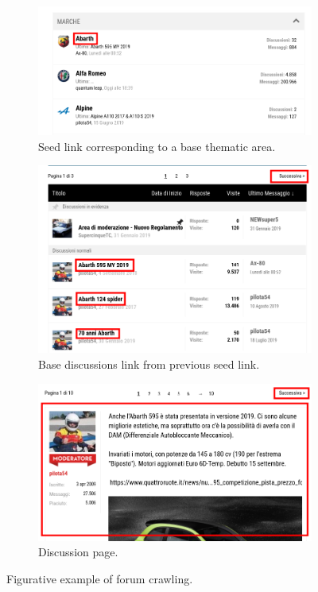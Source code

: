 \begin{figure}
	\centering
	\begin{subfigure}[ht]{0.8\textwidth}
		\centering
		\includegraphics[width=\textwidth]{figures/screen/crawl/main-thematic-areas.png}
		\caption{Seed link corresponding to a base thematic area.}
		\label{fig:crawl-seed}
	\end{subfigure}
	\hfill
	\begin{subfigure}[ht]{0.8\textwidth}
		\centering
		\includegraphics[width=\textwidth]{figures/screen/crawl/discussion-base.png}
		\caption{Base discussions link from previous seed link.}
		\label{fig:crawl-base-discussion}
	\end{subfigure}
	\hfill
	\begin{subfigure}[ht]{0.8\textwidth}
		\centering
		\includegraphics[width=\textwidth]{figures/screen/crawl/discussion.png}
		\caption{Discussion page.}
		\label{fig:crawl-discussion}
	\end{subfigure}
	\caption{Figurative example of forum crawling.}
	\label{fig:crawl}
\end{figure}

